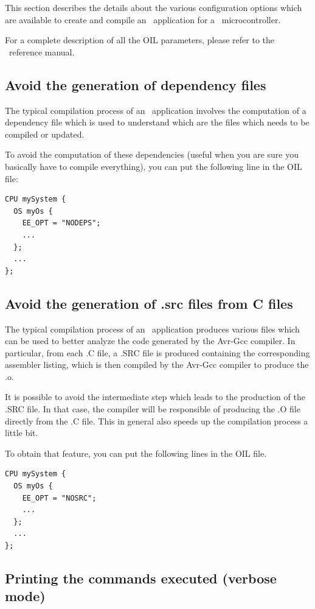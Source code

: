 This section describes the details about the various
configuration options which are available to create and compile an
\ee\ application for a \avr\ microcontroller.

\begin{note}
For a complete description of all the OIL parameters, please refer to
the \rtd\ reference manual.
\end{note}

\subsection{Avoid the generation of dependency files}
The typical compilation process of an \ee\ application involves the
computation of a dependency file which is used to understand which are
the files which needs to be compiled or updated.

To avoid the computation of these dependencies (useful when you are
sure you basically have to compile everything), you can put the
following line in the OIL file:

\begin{lstlisting}
CPU mySystem {
  OS myOs {
    EE_OPT = "NODEPS";
    ...
  };
  ...
};
\end{lstlisting}

\subsection{Avoid the generation of .src files from C files}
The typical compilation process of an \ee\ application produces
various files which can be used to better analyze the code generated
by the Avr-Gcc compiler. In particular, from each .C file, a .SRC file is
produced containing the corresponding assembler listing, which is then
compiled by the Avr-Gcc compiler to produce the .o.

It is possible to avoid the intermediate step which leads to the
production of the .SRC file. In that case, the compiler will be
responsible of producing the .O file directly from the .C file. This
in general also speeds up the compilation process a little bit.

To obtain that feature, you can put the following lines in the OIL
file.

\begin{lstlisting}
CPU mySystem {
  OS myOs {
    EE_OPT = "NOSRC";
    ...
  };
  ...
};
\end{lstlisting}

\subsection{Printing the commands executed (verbose mode)}

